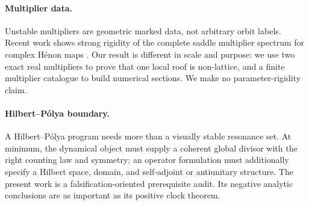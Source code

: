 \paragraph{Multiplier data.}
Unstable multipliers are geometric marked data, not arbitrary orbit labels.
Recent work shows strong rigidity of the complete saddle multiplier spectrum
for complex H\'enon maps \citep{CantatDujardin2026}.  Our result is different
in scale and purpose: we use two exact real multipliers to prove that one local
roof is non-lattice, and a finite multiplier catalogue to build numerical
sections.  We make no parameter-rigidity claim.

\paragraph{Hilbert--P\'olya boundary.}
A Hilbert--P\'olya program needs more than a visually stable resonance set.  At
minimum, the dynamical object must supply a coherent global divisor with the
right counting law and symmetry; an operator formulation must additionally
specify a Hilbert space, domain, and self-adjoint or antiunitary structure.
The present work is a falsification-oriented prerequisite audit.  Its negative
analytic conclusions are as important as its positive clock theorem.
